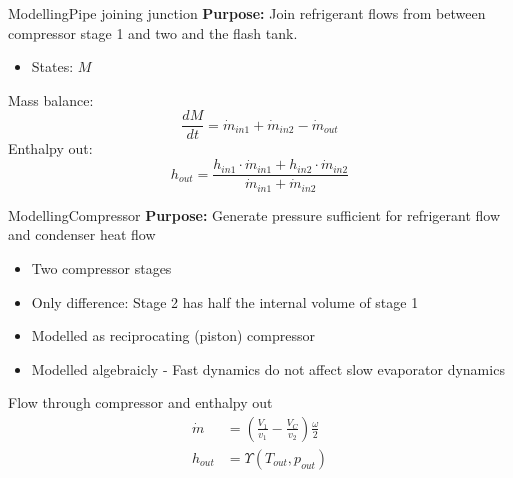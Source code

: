 
\begin{frame}{Modelling}{Pipe joining junction}
	\textbf{Purpose:} Join refrigerant flows from between compressor stage 1 and two and the flash tank.
	\begin{itemize}
		\item States: $M$
	\end{itemize}
	Mass balance:
	\begin{equation}
	 \frac{dM}{dt} = \dot{m}_{in1} + \dot{m}_{in2} - \dot{m}_{out}       \label{eq:PipeJoiningJunction_ChangeOfMass}
	\end{equation}
	Enthalpy out:
	\begin{equation} \label{eq:PipeJoiningJunction_Enthalpy}
		h_{out} = \frac{h_{in1} \cdot \dot{m}_{in1} + h_{in2} \cdot \dot{m}_{in2}}{ \dot{m}_{in1} + \dot{m}_{in2} }
	\end{equation}
	
\end{frame}




\begin{frame}{Modelling}{Compressor}
	\textbf{Purpose:} Generate pressure sufficient for refrigerant flow and condenser heat flow
	\begin{itemize}
		\item Two compressor stages
		\item Only difference: Stage 2 has half the internal volume of stage 1
		\item Modelled as reciprocating (piston) compressor
		\item Modelled algebraicly - Fast dynamics do not affect slow evaporator dynamics 
	\end{itemize}
	Flow through compressor and enthalpy out
	\begin{align}
		\dot{m} &= \left(\frac{V_1}{v_1} - \frac{V_C}{v_2}\right) \frac{\omega}{2} \label{eq:comp_mass_flow} \\
		h_{out} &= \Upsilon(T_{out}, p_{out}) \label{eq:comp_enthalpy}
	\end{align}
\end{frame}


